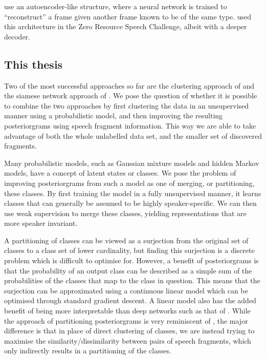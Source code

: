 \textcite{kamper2015unsupervised} use an autoencoder-like structure, where a neural network is trained to ``reconstruct'' a frame given another frame known to be of the same type.
\textcite{renshaw2015comparison} used this architecture in the Zero Resource Speech Challenge, albeit with a deeper decoder.

\subsection{This thesis}

Two of the most successful approaches so far are the clustering approach of \textcite{chen2015parallel} and the siamese network approach of \textcite{thiolliere2015hybrid}.
We pose the question of whether it is possible to combine the two approaches by first clustering the data in an unsupervised manner using a probabilistic model, and then improving the resulting posteriorgrams using speech fragment information.
This way we are able to take advantage of both the whole unlabelled data set, and the smaller set of discovered fragments.

Many probabilistic models, such as Gaussian mixture models and hidden Markov models, have a concept of latent states or classes.
We pose the problem of improving posteriorgrams from such a model as one of merging, or partitioning, these classes.
By first training the model in a fully unsupervised manner, it learns classes that can generally be assumed to be highly speaker-specific.
We can then use weak supervision to merge these classes, yielding representations that are more speaker invariant.

A partitioning of classes can be viewed as a surjection from the original set of classes to a class set of lower cardinality, but finding this surjection is a discrete problem which is difficult to optimise for.
However, a benefit of posteriorgrams is that the probability of an output class can be described as a simple sum of the probabilities of the classes that map to the class in question.
This means that the surjection can be approximated using a continuous linear model which can be optimised through standard gradient descent.
A linear model also has the added benefit of being more interpretable than deep networks such as that of \textcite{thiolliere2015hybrid}.
While the approach of partitioning posteriorgrams is very reminiscent of \textcite{jansen2013weak}, the major difference is that in place of direct clustering of classes, we are instead trying to maximise the similarity/dissimilarity between pairs of speech fragments, which only indirectly results in a partitioning of the classes.


